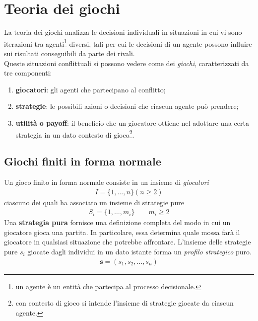 \chapter{Teoria dei giochi} %
\label{cha:teoria_dei_giochi}
La teoria dei giochi analizza le decisioni individuali in situazioni in cui vi sono iterazioni tra agenti\footnote{un agente è un entità che partecipa al processo decisionale.} diversi, tali per cui le decisioni di un agente possono influire sui risultati conseguibili da parte dei rivali.\\

Queste situazioni conflittuali si possono vedere come dei \emph{giochi}, caratterizzati da tre componenti:
\begin{enumerate}
	\item \textbf{giocatori}: gli agenti che partecipano al conflitto;
	\item \textbf{strategie}: le possibili azioni o decisioni che ciascun agente può prendere;
	\item \textbf{utilità o payoff}: il beneficio che un giocatore ottiene nel adottare una certa strategia in un dato contesto di gioco\footnote{con contesto di gioco si intende l’insieme di strategie giocate da ciascun agente.}.
\end{enumerate}

\section{Giochi finiti in forma normale} %
\label{sec:giochi_finiti_in_forma_normale}

Un gioco finito in forma normale consiste in un insieme di \emph{giocatori}
\begin{align}
	I= \{ 1,\dots, n\} (n \geq 2)
\end{align} ciascuno dei quali ha associato un insieme di strategie pure 
\begin{align}
	S_i = \{ 1, \dots, m_i \} \qquad m_i \geq 2
\end{align}
Una \textbf{strategia pura} fornisce una definizione completa del modo in cui un giocatore gioca una partita. In particolare, essa determina quale mossa farà il giocatore in qualsiasi situazione che potrebbe affrontare.
L’insieme delle strategie pure $s_i$ giocate dagli individui in un dato istante forma un \emph{profilo strategico} puro.
\begin{align}
	\mathbf{s} = (s_1, s_2, \dots, s_n)
\end{align}


